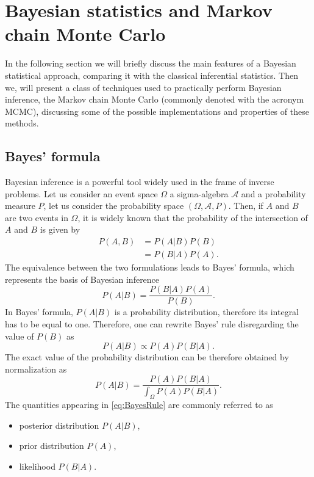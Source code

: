 \section{Bayesian statistics and Markov chain Monte Carlo}

In the following section we will briefly discuss the main features of a Bayesian statistical approach, comparing it with the classical inferential statistics. Then we, will present a class of techniques used to practically perform Bayesian inference, the Markov chain Monte Carlo (commonly denoted with the acronym MCMC), discussing some of the possible implementations and properties of these methods.
\subsection{Bayes' formula}
Bayesian inference is a powerful tool widely used in the frame of inverse problems. Let us consider an event space $\Omega$ a sigma-algebra $\mathcal{A}$ and a probability measure $P$, let us consider the probability space $(\Omega, \mathcal{A}, P)$. Then, if $A$ and $B$ are two events in $\Omega$, it is widely known that the probability of the intersection of $A$ and $B$ is given by
\begin{equation}
\begin{aligned}
	P(A, B) &= P(A|B)P(B) \\
	&= P(B|A)P(A).
\end{aligned}
\end{equation}
The equivalence between the two formulations leads to Bayes' formula, which represents the basis of Bayesian inference
\begin{equation}\label{eq:BayesRule}
	P(A|B) = \frac{P(B|A)P(A)}{P(B)}.
\end{equation}
In Bayes' formula, $P(A|B)$ is a probability distribution, therefore its integral has to be equal to one. Therefore, one can rewrite Bayes' rule disregarding the value of $P(B)$ as
\begin{equation}
	P(A|B) \propto P(A)P(B|A).
\end{equation}
The exact value of the probability distribution can be therefore obtained by normalization as
\begin{equation}
	P(A|B) = \frac{P(A)P(B|A)}{\int_{\Omega}P(A)P(B|A)}.
\end{equation}
The quantities appearing in \eqref{eq:BayesRule} are commonly referred to as
\begin{itemize}
	\item posterior distribution $P(A|B)$,
	\item prior distribution $P(A)$,
	\item likelihood $P(B|A)$.
\end{itemize} 
